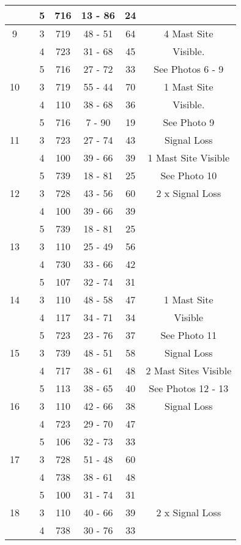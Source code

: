 \documentclass[a4paper,12pt]{article}
\begin{document}
\begin{tabular}{|c|c|c|c|c|c|c|}
 	&		&	 5	&	716	&	13 - 86	&	24	&		\\
\hline	
9	&		&	 3	&	719	&	48 - 51	&	64	&	4 Mast Site	\\
 	&		&	 4	&	723	&	31 - 68	&	45	&	Visible.	  	\\
 	&		&	 5	&	716	&	27 - 72	&	33	&	See Photos 6 - 9	\\
\hline	
10	&		&	 3	&	719	&	55 - 44	&	70	&	1 Mast Site	\\
 	&		&	 4	&	110	&	38 - 68	&	36	&	Visible.	  	\\
 	&		&	 5	&	716	&	 7 - 90	&	19	&	See Photo 9	\\
\hline	
11	&		&	 3	&	723	&	27 - 74	&	43	& Signal Loss \\
 	&		&	 4	&	100	&	39 - 66	&	39	& 1 Mast Site Visible \\
 	&		&	 5	&	739	&	18 - 81	&	25	& See Photo 10	\\
\hline	
12	&		&	 3	&	728	&	43 - 56	&	60	&2 x Signal Loss \\
 	&		&	 4	&	100	&	39 - 66	&	39	&		\\
 	&		&	 5	&	739	&	18 - 81	&	25	&		\\
\hline	
13	&		&	 3	&	110	&	25 - 49	&	56	&	 	\\
 	&		&	 4	&	730	&	33 - 66	&	42	&		\\
 	&		&	 5	&	107	&	32 - 74	&	31	&		\\
\hline	
14	&		&	 3	&	110	&	48 - 58	&	47	& 1 Mast Site \\
 	&		&	 4	&	117	&	34 - 71	&	34	& Visible	\\
 	&		&	 5	&	723	&	23 - 76	&	37	& See Photo 11	\\
\hline	
15	&		&	 3	&	739	&	48 - 51	&	58	& Signal Loss \\
 	&		&	 4	&	717	&	38 - 61	&	48	& 2 Mast Sites Visible \\
 	&		&	 5	&	113	&	38 - 65	&	40	& See Photos 12 - 13	\\
\hline	
16	&		&	 3	&	110	&	42 - 66	&	38	&Signal Loss \\
 	&		&	 4	&	723	&	29 - 70	&	47	&		\\
 	&		&	 5	&	106	&	32 - 73	&	33	&		\\
\hline	
17	&		&	 3	&	728	&	51 - 48	&	60	&		\\
 	&		&	 4	&	738	&	38 - 61	&	48	&		\\
 	&		&	 5	&	100	&	31 - 74	&	31	&		\\
\hline	
18	&		&	 3	&	110	&	40 - 66	&	39	& 2 x Signal Loss \\
 	&		&	 4	&	738	&	30 - 76	&	33	&		\\

\end{tabular}
\end{document}
